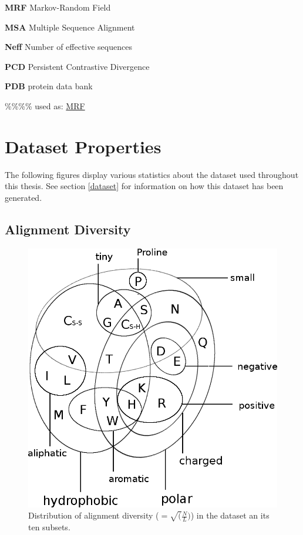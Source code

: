 \documentclass[12pt,a4paper,twoside]{book}
\theoremstyle{definition}
\theoremstyle{definition}
\theoremstyle{remark}
\begin{document}
\textbf{MRF} Markov-Random Field

\textbf{MSA} Multiple Sequence Alignment

\textbf{Neff} Number of effective sequences

\textbf{PCD} Persistent Contrastive Divergence

\textbf{PDB} protein data bank

\%\%\%\% used as: \protect\hyperlink{abbrev}{MRF}

\chapter{Dataset Properties}\label{dataset-properties}

The following figures display various statistics about the dataset used
throughout this thesis. See section \ref{dataset} for information on how
this dataset has been generated.

\section{Alignment Diversity}\label{alignment-diversity}




\begin{figure}
\includegraphics[width=1\linewidth]{img/amino_acid_physico_chemical_properties_venn_diagramm} \caption{Distribution of alignment diversity
(\(=\sqrt(\frac{N}{L})\)) in the dataset an its ten subsets.}\label{fig:dataset-diversity}
\end{figure}
\end{document}
